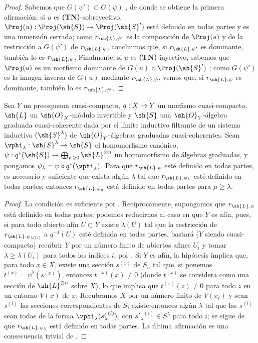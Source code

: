\documentclass[oneside,10pt]{amsart}
\makeatletter
\renewcommand{\geq}{\geqslant}
\newcommand{\ega@arrow}[2]{\mathchoice{#1}{#2}{#2}{#2}}
\renewcommand{\to}{\ega@arrow{\longrightarrow}{\rightarrow}}
\let\EGAOriginalLabel\label
\renewcommand{\label}[1]{\phantomsection\EGAOriginalLabel{#1}}
\makeatother
\begin{document}
\begin{proof}
Sabemos que $G(\psi')\subset G(\psi)$ , de donde se obtiene la primera afirmación;
si $u$ es \textbf{(TN)}-sobreyectivo, $\Proj(u):\Proj(\sh{S})\to\Proj(\sh{S}')$ está definido en todas partes y es una inmersión cerrada;
como $r_{\sh{L},\psi'}$ es la composición de $\Proj(u)$ y de la restricción a $G(\psi')$ de $r_{\sh{L},\psi}$, concluimos que, si $r_{\sh{L},\psi'}$ es dominante, también lo es $r_{\sh{L},\psi}$.
Finalmente, si $u$ es \textbf{(TN)}-inyectivo, sabemos que $\Proj(u)$ es un morfismo dominante de $G(u)$ a $\Proj(\sh{S}')$ ;
como $G(\psi')$ es la imagen inversa de $G(u)$ mediante $r_{\sh{L},\psi}$, vemos que, si $r_{\sh{L},\psi}$ es dominante, también lo es $r_{\sh{L},\psi'}$.
\end{proof}

\begin{proposition}[3.7.7]
\label{II.3.7.7}
Sea $Y$ un preesquema cuasi-compacto, $q:X\to Y$ un morfismo cuasi-compacto, $\sh{L}$ un $\sh{O}_X$-módulo invertible y $\sh{S}$ una $\sh{O}_Y$-álgebra graduada cuasi-coherente dada por el límite inductivo filtrante de un sistema inductivo $(\sh{S}^\lambda)$ de $\sh{O}_Y$-álgebras graduadas cuasi-coherentes.
Sean $\vphi_\lambda:\sh{S}^\lambda\to\sh{S}$ el homomorfismo canónico, $\psi:q^*(\sh{S})\to\bigoplus_{n\geq0}\sh{L}^{\otimes n}$ un homomorfismo de álgebras graduadas, y pongamos $\psi_\lambda=\psi\circ q^*(\vphi_\lambda)$.
Para que $r_{\sh{L},\psi}$ esté definido en todas partes, es necesario y suficiente que exista algún $\lambda$ tal que $r_{\sh{L},\psi_\lambda}$ esté definido en todas partes;
entonces $r_{\sh{L},\psi_\mu}$ está definido en todas partes para $\mu\geq\lambda$.
\end{proposition}

\begin{proof}
La condición es suficiente por .
Recíprocamente, supongamos que $r_{\sh{L},\psi}$ está definido en todas partes;
podemos reducirnos al caso en que $Y$ es afín, pues, si para todo abierto afín $U\subset Y$ existe $\lambda(U)$ tal que la restricción de $r_{\sh{L},\psi_{\lambda(U)}}$ a $q^{-1}(U)$ esté definida en todas partes, bastará ($Y$ siendo cuasi-compacto) recubrir $Y$ por un número finito de abiertos afines $U_i$ y tomar $\lambda\geq\lambda(U_i)$ para todos los índices $i$, por .
Si $Y$ es afín, la hipótesis implica que, para todo $x\in X$, existe una sección $s^{(x)}$ de $S_n$ tal que, si ponemos $t^{(x)}=\psi^\flat(s^{(x)})$, entonces $t^{(x)}(x)\neq0$ (donde $t^{(x)}$ se considera como una sección de $\sh{L}^{\otimes n}$ sobre $X$), lo que implica que $t^{(x)}(z)\neq0$ para todo $z$ en un entorno $V(x)$ de $x$.
Recubramos $X$ por un número finito de $V(x_i)$ y sean $s^{(i)}$ las secciones correspondientes de $S$;
existe entonces algún $\lambda$ tal que las $s^{(i)}$ sean todas de la forma $\vphi_\lambda({s'_{\lambda}}^{(i)})$, con ${s'_{\lambda}}^{(i)}\in S^\lambda$ para todo $i$;
se sigue de  que $r_{\sh{L},\psi_\lambda}$ está definido en todas partes.
La última afirmación es una consecuencia trivial de .
\end{proof}
\end{document}
